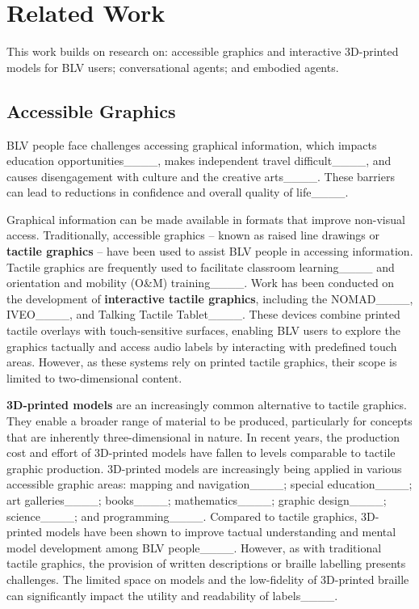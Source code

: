 \section{Related Work}
This work builds on research on: accessible graphics and interactive 3D-printed models for BLV users; conversational agents; and embodied agents.

\subsection{Accessible Graphics}
BLV people face challenges accessing graphical information, which impacts education opportunities____, makes independent travel difficult____, and causes disengagement with culture and the creative arts____. These barriers can lead to reductions in confidence and overall quality of life____.

Graphical information can be made available in formats that improve non-visual access. Traditionally, accessible graphics -- known as raised line drawings or \textbf{tactile graphics} -- have been used to assist BLV people in accessing information. Tactile graphics are frequently used to facilitate classroom learning____ and orientation and mobility (O\&M) training____. Work has been conducted on the development of \textbf{interactive tactile graphics}, including the NOMAD____, IVEO____, and Talking Tactile Tablet____. These devices combine printed tactile overlays with touch-sensitive surfaces, enabling BLV users to explore the graphics tactually and access audio labels by interacting with predefined touch areas. However, as these systems rely on printed tactile graphics, their scope is limited to two-dimensional content.

\textbf{3D-printed models} are an increasingly common alternative to tactile graphics. They enable a broader range of material to be produced, particularly for concepts that are inherently three-dimensional in nature. In recent years, the production cost and effort of 3D-printed models have fallen to levels comparable to tactile graphic production. 3D-printed models are increasingly being applied in various accessible graphic areas: mapping and navigation____; special education____; art galleries____; books____; mathematics____; graphic design____; science____; and programming____. Compared to tactile graphics, 3D-printed models have been shown to improve tactual understanding and mental model development among BLV people____. However, as with traditional tactile graphics, the provision of written descriptions or braille labelling presents challenges. The limited space on models and the low-fidelity of 3D-printed braille can significantly impact the utility and readability of labels____.


